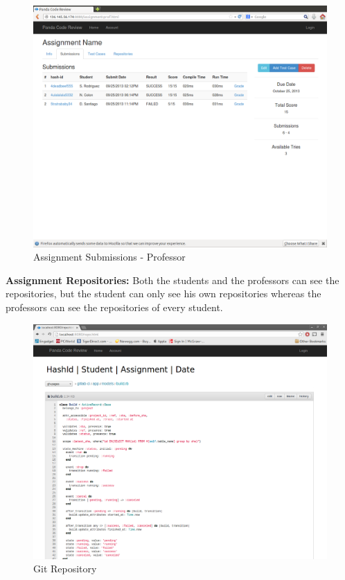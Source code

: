 \begin{figure}[H]
	\centering
	\includegraphics[width=\textwidth]{img/assignment-sub-prof}
	\caption{Assignment Submissions - Professor}
\end{figure}

\textbf{Assignment Repositories:} Both the students and the professors can
see the repositories, but the student can only see his own repositories whereas
the professors can see the repositories of every student.

\begin{figure}[H]
	\centering
	\includegraphics[width=\textwidth]{img/repo}
	\caption{Git Repository}
\end{figure}

